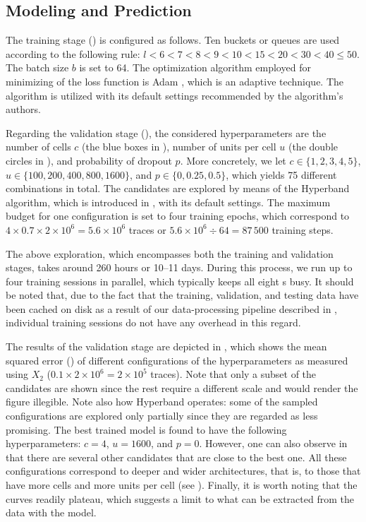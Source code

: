 \subsection{Modeling and Prediction}
The training stage () is configured as follows. Ten buckets or
queues are used according to the following rule: $l < 6 < 7 < 8 < 9 < 10 < 15 <
20 < 30 < 40 \leq 50$. The batch size $b$ is set to 64. The optimization
algorithm employed for minimizing of the loss function is Adam
\cite{kingma2014}, which is an adaptive technique. The algorithm is utilized
with its default settings recommended by the algorithm's authors.

Regarding the validation stage (), the considered
hyperparameters are the number of cells $c$ (the blue boxes in ),
number of units per cell $u$ (the double circles in ), and
probability of dropout $p$. More concretely, we let $c \in \{1, 2, 3, 4, 5\}$,
$u \in \{100, 200, 400, 800, 1600\}$, and $p \in \{0, 0.25, 0.5\}$, which yields
75 different combinations in total. The candidates are explored by means of the
Hyperband algorithm, which is introduced in , with its default
settings. The maximum budget for one configuration is set to four training
epochs, which correspond to $4 \times 0.7 \times 2 \times 10^6 = 5.6 \times
10^6$ traces or $5.6 \times 10^6 \div 64 = 87\,500$ training steps.

The above exploration, which encompasses both the training and validation
stages, takes around 260 hours or 10--11 days. During this process, we run up to
four training sessions in parallel, which typically keeps all eight s
busy. It should be noted that, due to the fact that the training, validation,
and testing data have been cached on disk as a result of our data-processing
pipeline described in , individual training sessions do not have any
overhead in this regard.



The results of the validation stage are depicted in , which
shows the mean squared error () of different configurations of the
hyperparameters as measured using $X_2$ ($0.1 \times 2 \times 10^6 = 2 \times
10^5$ traces). Note that only a subset of the candidates are shown since the
rest require a different scale and would render the figure illegible. Note also
how Hyperband operates: some of the sampled configurations are explored only
partially since they are regarded as less promising. The best trained model is
found to have the following hyperparameters: $c = 4$, $u = 1600$, and $p = 0$.
However, one can also observe in  that there are several other
candidates that are close to the best one. All these configurations correspond
to deeper and wider architectures, that is, to those that have more cells and
more units per cell (see ). Finally, it is worth noting that the
curves readily plateau, which suggests a limit to what can be extracted from the
data with the model.

